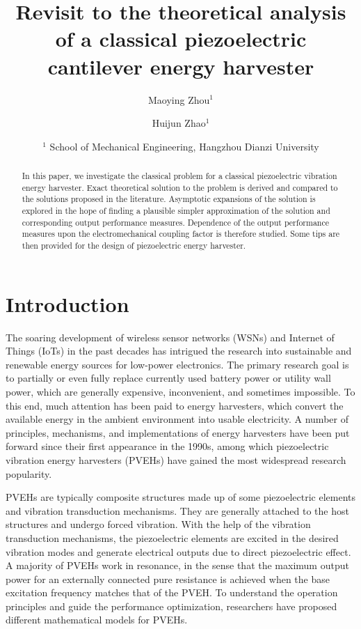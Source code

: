 \documentclass{article}
\title{Revisit to the theoretical analysis of a classical piezoelectric cantilever energy harvester}
\author{Maoying Zhou$^1$ \and Huijun Zhao$^1$}
\date{%
    $^1$ School of Mechanical Engineering, Hangzhou Dianzi University
}
\begin{document}
\maketitle


\begin{abstract}
 In this paper, we investigate the classical problem for a classical piezoelectric vibration energy harvester. Exact theoretical solution to the problem is derived and compared to the solutions proposed in the literature. Asymptotic expansions of the solution is explored in the hope of finding a plausible simpler approximation of the solution and corresponding output performance measures. Dependence of the output performance measures upon the electromechanical coupling factor is therefore studied. Some tips are then provided for the design of piezoelectric energy harvester.
\end{abstract}


\section{Introduction}
 
The soaring development of wireless sensor networks (WSNs) and Internet of Things (IoTs) in the past decades has intrigued the research into sustainable and renewable energy sources for low-power electronics. The primary research goal is to partially or even fully replace currently used battery power or utility wall power, which are generally expensive, inconvenient, and sometimes impossible. To this end, much attention has been paid to energy harvesters, which convert the available energy in the ambient environment into usable electricity. A number of principles, mechanisms, and implementations of energy harvesters have been put forward since their first appearance in the 1990s, \cite{beeby2006energy,anton2007review,zhou2018review,safaei2019review} among which piezoelectric vibration energy harvesters (PVEHs) have gained the most widespread research popularity. 

PVEHs are typically composite structures made up of some piezoelectric elements and vibration transduction mechanisms. They are generally attached to the host structures and undergo forced vibration. With the help of the vibration transduction mechanisms, the piezoelectric elements are excited in the desired vibration modes and generate electrical outputs due to direct piezoelectric effect. A majority of PVEHs work in resonance, in the sense that the maximum output power for an externally connected pure resistance is achieved when the base excitation frequency matches that of the PVEH. \cite{roundy2003study} To understand the operation principles and guide the performance optimization, researchers have proposed different mathematical models for PVEHs. 
\end{document}
